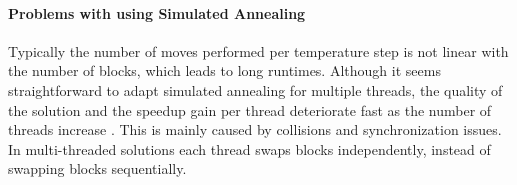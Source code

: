 \documentclass[a4paper,oneside,12pt]{article}
\begin{document}


\paragraph{Problems with using Simulated Annealing}
Typically the number of moves performed per temperature step is not linear with the number of blocks, which leads to long runtimes.
Although it seems straightforward to adapt simulated annealing for multiple threads, the quality of the solution and the speedup gain per thread deteriorate fast as the number of threads increase \cite{ludwin2011}. This is mainly caused by collisions and synchronization issues. In multi-threaded solutions each thread swaps blocks independently, instead of swapping blocks sequentially.
\end{document}
